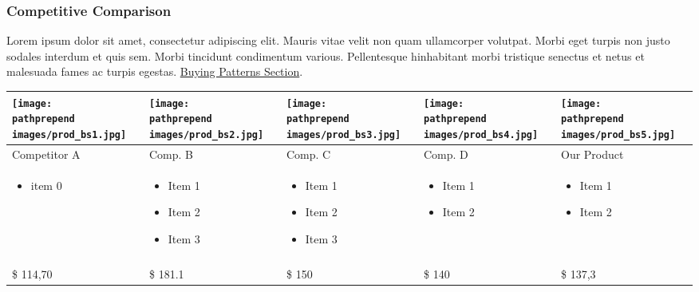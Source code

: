 \documentclass[11pt]{article}
\def\pathprepend{}%
\def\pathprepend{business_plan/}%
\begin{document}
\subsubsection{Competitive Comparison}
Lorem ipsum dolor sit amet, consectetur adipiscing elit. Mauris vitae velit
non quam ullamcorper volutpat. Morbi eget turpis non justo sodales interdum
et quis sem. Morbi tincidunt condimentum various. Pellentesque hinhabitant morbi
tristique senectus et netus et malesuada fames ac turpis egestas.\newline
\hyperlink{competition_and_buying_patterns}{Buying Patterns Section}.\newline\newline
\begin{tabular}{| m{80 pt} | m{80 pt} | m{80 pt} | m{80 pt} | m{80 pt} |}\hline
	\texttt{[image: \\pathprepend images/prod\_bs1.jpg]} &
		\texttt{[image: \\pathprepend images/prod\_bs2.jpg]} &
		\texttt{[image: \\pathprepend images/prod\_bs3.jpg]} &
		\texttt{[image: \\pathprepend images/prod\_bs4.jpg]} &
		\texttt{[image: \\pathprepend images/prod\_bs5.jpg]} \\ \hline
	Competitor A & Comp. B & Comp. C & Comp. D & Our Product\\ \hline
	\begin{itemize} \tiny \item  item 0\end{itemize} &
					\begin{itemize} \tiny
							\item Item 1
							\item Item 2
							\item Item 3
							\end{itemize} &
					\begin{itemize} \tiny
							\item Item 1
							\item Item 2
							\item Item 3 \end{itemize}&
					\begin{itemize} \tiny
							\item Item 1
							\item Item 2
							\end{itemize}&
					\begin{itemize} \tiny
							\item Item 1
							\item Item 2
							\end{itemize} \\
	& & & &\\ \hline
	\$ 114,70 & \$ 181.1 & \$ 150 & \$ 140 & \$ 137,3\\ \hline
\end{tabular}
\end{document}
